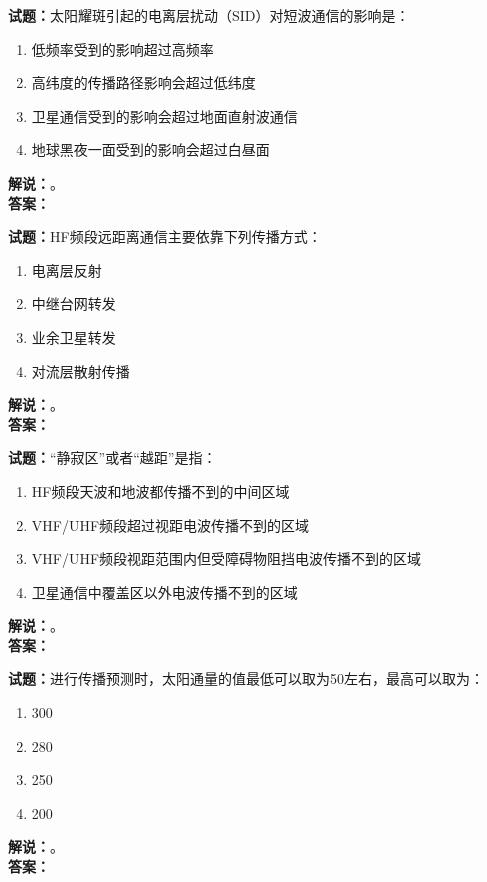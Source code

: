 \documentclass{ctexbook}
\begin{document}
\bigskip

\noindent\textbf{试题：}太阳耀斑引起的电离层扰动（SID）对短波通信的影响是：
\begin{enumerate}[leftmargin=3em]
  \item 低频率受到的影响超过高频率
  \item 高纬度的传播路径影响会超过低纬度
  \item 卫星通信受到的影响会超过地面直射波通信
  \item 地球黑夜一面受到的影响会超过白昼面
\end{enumerate}
\noindent\textbf{解说：}\textbf{}。\\\noindent\textbf{答案：}

\bigskip

\noindent\textbf{试题：}HF频段远距离通信主要依靠下列传播方式：
\begin{enumerate}[leftmargin=3em]
  \item 电离层反射
  \item 中继台网转发
  \item 业余卫星转发
  \item 对流层散射传播
\end{enumerate}
\noindent\textbf{解说：}\textbf{}。\\\noindent\textbf{答案：}

\bigskip

\noindent\textbf{试题：}“静寂区”或者“越距”是指：
\begin{enumerate}[leftmargin=3em]
  \item HF频段天波和地波都传播不到的中间区域
  \item VHF/UHF频段超过视距电波传播不到的区域
  \item VHF/UHF频段视距范围内但受障碍物阻挡电波传播不到的区域
  \item 卫星通信中覆盖区以外电波传播不到的区域
\end{enumerate}
\noindent\textbf{解说：}\textbf{}。\\\noindent\textbf{答案：}

\bigskip

\noindent\textbf{试题：}进行传播预测时，太阳通量的值最低可以取为50左右，最高可以取为：
\begin{enumerate}[leftmargin=3em]
  \item 300
  \item 280
  \item 250
  \item 200
\end{enumerate}
\noindent\textbf{解说：}\textbf{}。\\\noindent\textbf{答案：}
\end{document}
